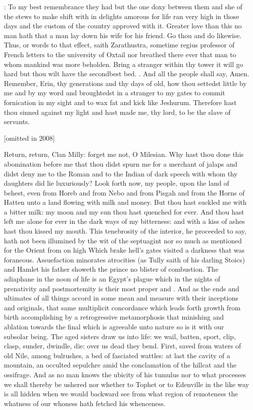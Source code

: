 \stephen:
To my best remembrance they had but the one doxy between them and she
of the stews to make shift with in delights amorous for life ran very high
in those days
and the custom of the country approved with it.
Greater love
than this no man hath that a man lay down his wife for his friend.
Go thou
and do likewise.
Thus,
or words to that effect,
saith Zarathustra,
sometime regius professor of French letters to the university of Oxtail
nor breathed there ever that man to whom mankind was more beholden.
Bring
a stranger within thy tower it will go hard but thou wilt have the
secondbest bed.
.
And all the people
shall say,
Amen.
Remember,
Erin,
thy generations and thy days of old,
how
thou settedst little by me and by my word and broughtedst in a stranger to
my gates to commit fornication in my sight and to wax fat and kick like
Jeshurum.
Therefore hast thou sinned against my light and hast made me,
thy lord,
to be the slave of servants.

[omitted in 2008]

Return,
return,
Clan Milly:
forget me not,
O Milesian.
Why hast thou done this abomination
before me that thou didst spurn me for a merchant of jalaps and didst
deny me to the Roman and to the Indian of dark speech with whom thy
daughters did lie luxuriously?
Look forth now,
my people,
upon the land of behest,
even from Horeb and from Nebo and from Pisgah and from the
Horns of Hatten unto a land flowing with milk and money.
But thou hast suckled me with a bitter milk:
my moon and my sun thou hast quenched for ever.
And thou hast left me alone for ever in the dark ways of my
bitterness:
and with a kiss of ashes hast thou kissed my mouth.
This tenebrosity of the interior,
he proceeded to say,
hath not been illumined
by the wit of the septuagint nor so much as mentioned for the Orient from
on high Which brake hell's gates visited a darkness that was foraneous.
Assuefaction minorates atrocities
(as Tully saith of his darling Stoics)
and Hamlet his father showeth the prince no blister of combustion.
The adiaphane in the noon of life is an Egypt's plague which in the nights of
prenativity and postmortemity is their most proper  and .
And as the ends and ultimates of all things accord in some mean and measure
with their inceptions and originals,
that same multiplicit concordance
which leads forth growth from birth
accomplishing by a retrogressive metamorphosis
that minishing and ablation towards the final which is
agreeable unto nature so is it with our subsolar being.
The aged sisters
draw us into life:
we wail,
batten,
sport,
clip,
clasp,
sunder,
dwindle,
die:
over us dead they bend.
First,
saved from waters of old Nile,
among
bulrushes,
a bed of fasciated wattles:
at last the cavity of a mountain,
an occulted sepulchre amid the conclamation of the hillcat and the
ossifrage.
And as no man knows the ubicity of his tumulus nor to what
processes we shall thereby be ushered nor whether to Tophet or to
Edenville in the like way is all hidden when we would backward see from
what region of remoteness the whatness of our whoness
hath fetched his whenceness.

